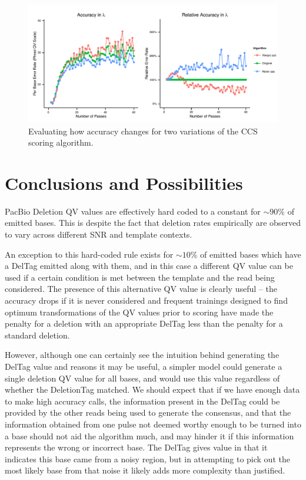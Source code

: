 \documentclass[fleqn,10pt]{SelfArx} %
\begin{document}
\begin{figure}[ht]\centering
\includegraphics[width=\linewidth]{LambdaComparison.pdf}
\caption{Evaluating how accuracy changes for two variations of the CCS scoring algorithm.   }
\label{fig:lambdaTest}
\end{figure}






\section{Conclusions and Possibilities}
PacBio Deletion QV values are effectively hard coded to a constant for $\sim90\%$ of emitted bases.  This is despite the fact that deletion rates empirically are observed to vary across different SNR and template contexts.

An exception to this hard-coded rule exists for $\sim10\%$ of emitted bases which have a DelTag emitted along with them, and in this case a different QV value can be used if a certain condition is met between the template and the read being considered.  The presence of this alternative QV value is clearly useful -- the accuracy drops if it is never considered and  frequent trainings designed to find optimum transformations of the QV values prior to scoring have made the penalty for a deletion with an appropriate DelTag less than the penalty for a standard deletion.

However, although one can certainly see the intuition behind generating the DelTag value and reasons it may be useful, a simpler model could generate a single deletion QV value for all bases, and would use this value regardless of whether the DeletionTag matched.  We should expect that if we have enough data to make high accuracy calls, the information present in the DelTag could be provided by the other reads being used to generate the consensus, and that the information obtained from one pulse not deemed worthy enough to be turned into a base should not aid the algorithm much, and may hinder it if this information represents the wrong or incorrect base.  The DelTag gives value in that it indicates this base came from a noisy region, but in attempting to pick out the most likely base from that noise it likely adds more complexity than justified.
\end{document}
